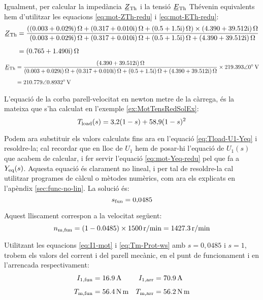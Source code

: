 \begin{exemple}
	Igualment, per calcular  la impedància $\cmplx{Z}\ped{Th}$ i la tensió $\cmplx{E}\ped{Th}$ Thévenin equivalents hem d'utilitzar les equacions \eqref{eq:mot-ZTh-redu} i \eqref{eq:mot-ETh-redu}:
	\begin{align*}
		\cmplx{Z}\ped{Th} &= \frac{(\complexqty{0,003+j0,029}{\ohm} + \complexqty{0,317+j0,010}{\ohm} +  \complexqty{0,5+j1,5}{\ohm})\times\complexqty{4,390+j39,512}{\ohm}}
		{\complexqty{0,003+j0,029}{\ohm} + \complexqty{0,317+j0,010}{\ohm} + \complexqty{0,5+j1,5}{\ohm}+\complexqty{4,390+j39,512}{\ohm}}  \\[1ex]   
		&= \complexqty{0,765+j1,490}{\ohm}
	\end{align*}
	\vspace{-7mm}
	\begin{align*}		
		\cmplx{E}\ped{Th}  &= \frac{\complexqty{4,390+j39,512}{\ohm}}
		{\complexqty{0,003+j0,029}{\ohm} + \complexqty{0,317+j0,010}{\ohm} + \complexqty{0,5+j1,5}{\ohm}+\complexqty{4,390+j39,512}{\ohm}}\times
		\complexqty{219,393:0}{V}  \\[1ex]   
		&=  \complexqty{210,779:0,8932}{V}
	\end{align*}
	
	L'equació de la corba parell-velocitat en newton metre de la càrrega, és la mateixa que s'ha calculat en l'exemple  \ref{ex:MotTensRedSolEx}:
	\[
		T_\mathrm{load}(s) = 3{,}2 (1-s) + 58{,}9 (1-s)^2
	\]
	
	Podem ara substituir els  valors calculats fins ara en l'equació \eqref{eq:Tload-U1-Yeq} i resoldre-la; cal recordar que en lloc de $U_1$ hem de posar-hi l'equació de $U_1(s)$ que acabem de calcular, i fer servir l'equació \eqref{eq:mot-Yeq-redu} pel que fa a $Y_\mathrm{eq}(s)$. Aquesta equació és clarament no lineal, i per tal de resoldre-la cal utilitzar programes de càlcul o mètodes numèrics, com ara els explicats en l'apèndix \ref{sec:func-no-lin}. La solució és:
	\[
		s_\mathrm{fun} = 0{,}0485
	\]
	
	Aquest lliscament correspon a la velocitat següent:
	\[
		n_\mathrm{m,fun}= (1-\num{0,0485})\times \qty{1500}{r/min} = \qty{1427,3}{r/min}
	\]
	
	Utilitzant les equacions \eqref{eq:I1-mot} i \eqref{eq:Tm-Prot-ws} amb $s=0{,}0485$ i $s=1$, trobem els valors del corrent i del parell mecànic, en el punt de funcionament  i en l'arrencada respectivament:
	\begin{align*}
		I_\mathrm{1,fun} &= \qty{16,9}{A} &
		I_\mathrm{1,arr} &= \qty{70,9}{A} \\[1ex] 
		T_\mathrm{m,fun} &=  \qty{56,4}{N.m} & 
		T_\mathrm{m,arr} &=  \qty{56,2}{N.m}
	\end{align*}
	

\end{exemple}
